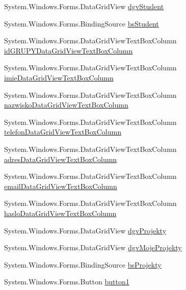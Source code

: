 \begin{DoxyCompactItemize}
\item 
System.\+Windows.\+Forms.\+Data\+Grid\+View \hyperlink{class_dziennik_ocen_1_1_form_student_a375564d2938cbebbdb9ec4ca4e20ee1c}{dgv\+Student}
\item 
System.\+Windows.\+Forms.\+Binding\+Source \hyperlink{class_dziennik_ocen_1_1_form_student_a70c4ab0ecfb4aa90923562f2296a29bf}{bs\+Student}
\item 
System.\+Windows.\+Forms.\+Data\+Grid\+View\+Text\+Box\+Column \hyperlink{class_dziennik_ocen_1_1_form_student_a77df75fb06fa5e0c5d28109a0fdf017b}{id\+G\+R\+U\+P\+Y\+Data\+Grid\+View\+Text\+Box\+Column}
\item 
System.\+Windows.\+Forms.\+Data\+Grid\+View\+Text\+Box\+Column \hyperlink{class_dziennik_ocen_1_1_form_student_aeab178cb64c3f5a9232d052c03115420}{imie\+Data\+Grid\+View\+Text\+Box\+Column}
\item 
System.\+Windows.\+Forms.\+Data\+Grid\+View\+Text\+Box\+Column \hyperlink{class_dziennik_ocen_1_1_form_student_a017b724e3d91906b75adf31e5e05f9ee}{nazwisko\+Data\+Grid\+View\+Text\+Box\+Column}
\item 
System.\+Windows.\+Forms.\+Data\+Grid\+View\+Text\+Box\+Column \hyperlink{class_dziennik_ocen_1_1_form_student_a77809a3c1211ddf397d615357ebf9982}{telefon\+Data\+Grid\+View\+Text\+Box\+Column}
\item 
System.\+Windows.\+Forms.\+Data\+Grid\+View\+Text\+Box\+Column \hyperlink{class_dziennik_ocen_1_1_form_student_a9670f026137e2799df4901138ea44fe0}{adres\+Data\+Grid\+View\+Text\+Box\+Column}
\item 
System.\+Windows.\+Forms.\+Data\+Grid\+View\+Text\+Box\+Column \hyperlink{class_dziennik_ocen_1_1_form_student_a938dabf12cf4dbf3c3821356271b6c90}{email\+Data\+Grid\+View\+Text\+Box\+Column}
\item 
System.\+Windows.\+Forms.\+Data\+Grid\+View\+Text\+Box\+Column \hyperlink{class_dziennik_ocen_1_1_form_student_aa3a09279916f9f9af11df4ca4f4e4a2a}{haslo\+Data\+Grid\+View\+Text\+Box\+Column}
\item 
System.\+Windows.\+Forms.\+Data\+Grid\+View \hyperlink{class_dziennik_ocen_1_1_form_student_a7d9abb2899119208b489ed60f26f12e5}{dgv\+Projekty}
\item 
System.\+Windows.\+Forms.\+Data\+Grid\+View \hyperlink{class_dziennik_ocen_1_1_form_student_a0228009ac4ed48fc4ad1bee184883b84}{dgv\+Moje\+Projekty}
\item 
System.\+Windows.\+Forms.\+Binding\+Source \hyperlink{class_dziennik_ocen_1_1_form_student_af848e4daa2793882a2b76cd164fde330}{bs\+Projekty}
\item 
System.\+Windows.\+Forms.\+Button \hyperlink{class_dziennik_ocen_1_1_form_student_a257a59fdf1636c5a6741c42db75714df}{button1}
\end{DoxyCompactItemize}



